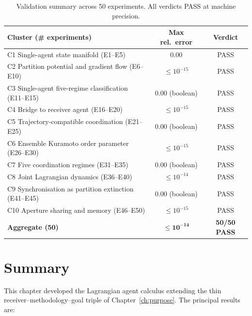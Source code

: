 \begin{table}[h!]\centering
\begin{tabular}{lcc}
\toprule
\textbf{Cluster (\# experiments)} & \textbf{Max rel.\ error} & \textbf{Verdict}\\
\midrule
C1 Single-agent state manifold (E1--E5)   & $0.00$            & PASS \\
C2 Partition potential and gradient flow (E6--E10) & $\le 10^{-15}$ & PASS \\
C3 Single-agent five-regime classification (E11--E15) & $0.00$ (boolean) & PASS \\
C4 Bridge to receiver agent (E16--E20)    & $\le 10^{-15}$    & PASS \\
C5 Trajectory-compatible coordination (E21--E25) & $0.00$ (boolean) & PASS \\
C6 Ensemble Kuramoto order parameter (E26--E30) & $\le 10^{-15}$ & PASS \\
C7 Five coordination regimes (E31--E35)   & $0.00$ (boolean)  & PASS \\
C8 Joint Lagrangian dynamics (E36--E40)   & $\le 10^{-14}$    & PASS \\
C9 Synchronisation as partition extinction (E41--E45) & $0.00$ (boolean) & PASS \\
C10 Aperture sharing and memory (E46--E50)& $\le 10^{-15}$    & PASS \\
\midrule
\textbf{Aggregate (50)} & $\mathbf{\le 10^{-14}}$ & \textbf{50/50 PASS} \\
\bottomrule
\end{tabular}
\caption{Validation summary across 50 experiments. All verdicts PASS at
machine precision.}
\label{tab:ch04-validation}
\end{table}

\section{Summary}
\label{sec:ch04-summary}

This chapter developed the Lagrangian agent calculus extending the thin
receiver--methodology--goal triple of Chapter~\ref{ch:purpose}. The
principal results are:

